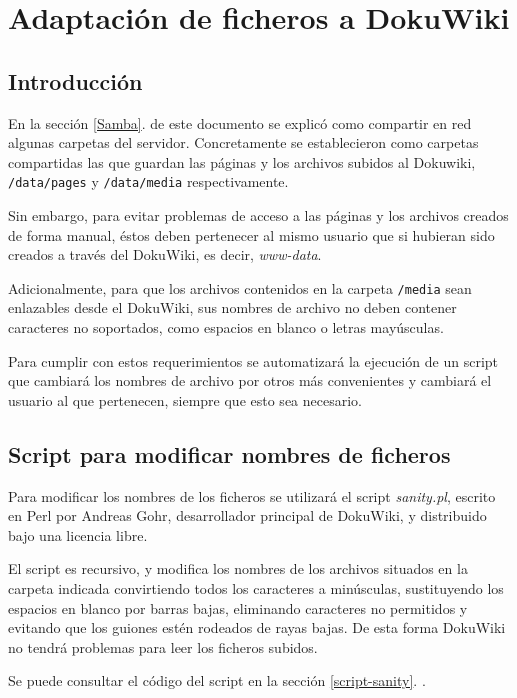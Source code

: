\section{Adaptación de ficheros a DokuWiki}
\label{sanity}

\subsection{Introducción}

En la sección \ref{Samba}.  de este documento se explicó como compartir en red algunas carpetas del servidor. Concretamente se establecieron como carpetas compartidas las que guardan las páginas y los archivos subidos al Dokuwiki, \texttt{/data/pages} y \texttt{/data/media} respectivamente.

Sin embargo, para evitar problemas de acceso a las páginas y los archivos creados de forma manual, éstos deben pertenecer al mismo usuario que si hubieran sido creados a través del DokuWiki, es decir, \textit{www-data}.

Adicionalmente, para que los archivos contenidos en la carpeta \texttt{/media} sean enlazables desde el DokuWiki, sus nombres de archivo no deben contener caracteres no soportados, como espacios en blanco o letras mayúsculas.

Para cumplir con estos requerimientos se automatizará la ejecución de un script que cambiará los nombres de archivo por otros más convenientes y cambiará el usuario al que pertenecen, siempre que esto sea necesario.

\subsection{Script para modificar nombres de ficheros}

Para modificar los nombres de los ficheros se utilizará el script \textit{sanity.pl}, escrito en Perl por Andreas Gohr, desarrollador principal de DokuWiki, y distribuido bajo una licencia libre.

El script es recursivo, y modifica los nombres de los archivos situados en la carpeta indicada convirtiendo todos los caracteres a minúsculas, sustituyendo los espacios en blanco por barras bajas, eliminando caracteres no permitidos y evitando que los guiones estén rodeados de rayas bajas. De esta forma DokuWiki no tendrá problemas para leer los ficheros subidos.

Se puede consultar el código del script en la sección \ref{script-sanity}. .

